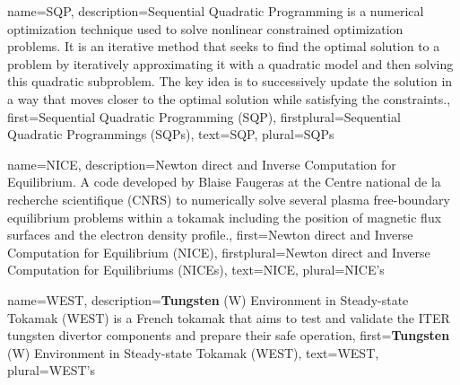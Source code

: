 {%
  name={SQP},%
  description={Sequential Quadratic Programming is a numerical optimization technique used to solve nonlinear constrained optimization problems. It is an iterative method that seeks to find the optimal solution to a problem by iteratively approximating it with a quadratic model and then solving this quadratic subproblem. The key idea is to successively update the solution in a way that moves closer to the optimal solution while satisfying the constraints.},%
  first={Sequential Quadratic Programming (SQP)},%
  firstplural={Sequential Quadratic Programmings (SQPs)},%
  text={SQP},%
  plural={SQPs}%
}


{%
  name={NICE},%
  description={Newton direct and Inverse Computation for Equilibrium. A code developed by Blaise Faugeras at the Centre national de la recherche scientifique (CNRS) to numerically solve several plasma free-boundary equilibrium problems within a tokamak including the position of magnetic flux surfaces and the electron density profile.},%
  first={Newton direct and Inverse Computation for Equilibrium (NICE)},%
  firstplural={Newton direct and Inverse Computation for Equilibriums (NICEs)},%
  text={NICE},%
  plural={NICE's}%
}

{%
  name={WEST},%
  description={\textbf{Tungsten} (W) Environment in Steady-state Tokamak (WEST) is a French tokamak that aims to test and validate the ITER tungsten divertor components and prepare their safe operation},%
  first={\textbf{Tungsten} (W) Environment in Steady-state Tokamak (WEST)},%
  text={WEST},%
  plural={WEST's}%
}





